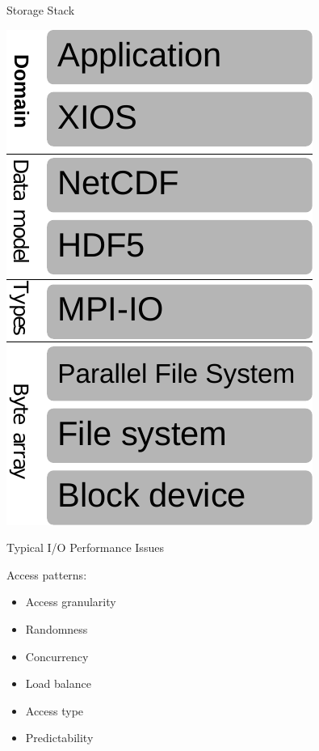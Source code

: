 \documentclass[compress,11pt,xcolor=svgnames,aspectratio=169]{beamer}
\begin{document}
\begin{frame}[t]{Storage Stack}

\begin{center}
\includegraphics[scale=0.5]{fig/layers-xios}
\end{center}

\end{frame}

\begin{frame}[t]{Typical I/O Performance Issues}

 Access patterns:

    \begin{itemize}
    \setlength\itemsep{0.3cm}
        \item Access granularity
        \item Randomness
        \item Concurrency
        \item Load balance
        \item Access type
        \item Predictability
    \end{itemize}

\end{frame}
\end{document}
